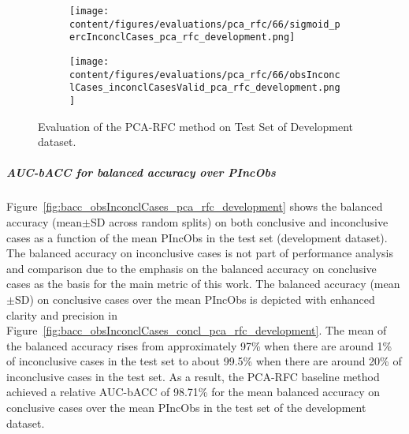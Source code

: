 \begin{figure}[ht]
  \begin{subfigure}{0.48\textwidth}
    \centering
    \texttt{[image: content/figures/evaluations/pca\_rfc/66/sigmoid\_percInconclCases\_pca\_rfc\_development.png]}
    \label{fig:pca_rfc_percInconclCases_development}
  \end{subfigure}
  \hfill
  \begin{subfigure}{0.495\textwidth}
    \centering
    \texttt{[image: content/figures/evaluations/pca\_rfc/66/obsInconclCases\_inconclCasesValid\_pca\_rfc\_development.png]}
    \label{fig:obsInconclCases_inconclCasesValid_pca_rfc_development}
  \end{subfigure}

  \caption{Evaluation of the PCA-RFC method on Test Set of Development dataset.}
  \label{fig:pca_rfc_dev_fig}
\end{figure}


\subparagraph{AUC-bACC for balanced accuracy over PIncObs}

Figure~\ref{fig:bacc_obsInconclCases_pca_rfc_development} shows the balanced accuracy (mean$\pm$SD across random splits) 
on both conclusive and inconclusive cases as a function of the mean PIncObs
in the test set (development dataset).
The balanced accuracy on inconclusive cases is not part of performance analysis and comparison 
due to the emphasis on the balanced accuracy on conclusive cases as the basis for the main metric of this work.
The balanced accuracy (mean$\pm$SD) on conclusive cases over the mean PIncObs
is depicted with enhanced clarity and precision in Figure~\ref{fig:bacc_obsInconclCases_concl_pca_rfc_development}.
The mean of the balanced accuracy rises from approximately 97\% 
when there are around 1\% of inconclusive cases in the test set to about 99.5\% 
when there are around 20\% of inconclusive cases in the test set.
As a result, the PCA-RFC baseline method achieved a relative AUC-bACC of 98.71\% for the mean balanced accuracy on conclusive cases
over the mean PIncObs in the test set of the development dataset.


